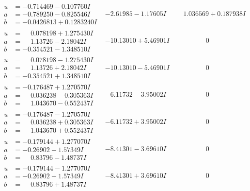 \documentclass[1p]{elsarticle_modified}
\theoremstyle{definition}
\begin{document}
$$\begin{array}{c|c|c}
\begin{aligned}
u &= -0.714469 - 0.107760 I \\
a &= -0.789250 - 0.825546 I \\
b &= -0.0426813 + 0.1283240 I\end{aligned}
 & -2.61985 - 1.17605 I & \phantom{-}1.036569 + 0.187938 I \\ \hline\begin{aligned}
u &= \phantom{-}0.078198 + 1.275430 I \\
a &= \phantom{-}1.13726 - 2.18042 I \\
b &= -0.354521 - 1.348510 I\end{aligned}
 & -10.13010 + 5.46901 I & \phantom{-0.000000 } 0 \\ \hline\begin{aligned}
u &= \phantom{-}0.078198 - 1.275430 I \\
a &= \phantom{-}1.13726 + 2.18042 I \\
b &= -0.354521 + 1.348510 I\end{aligned}
 & -10.13010 - 5.46901 I & \phantom{-0.000000 } 0 \\ \hline\begin{aligned}
u &= -0.176487 + 1.270570 I \\
a &= \phantom{-}0.036238 - 0.305363 I \\
b &= \phantom{-}1.043670 - 0.552437 I\end{aligned}
 & -6.11732 - 3.95002 I & \phantom{-0.000000 } 0 \\ \hline\begin{aligned}
u &= -0.176487 - 1.270570 I \\
a &= \phantom{-}0.036238 + 0.305363 I \\
b &= \phantom{-}1.043670 + 0.552437 I\end{aligned}
 & -6.11732 + 3.95002 I & \phantom{-0.000000 } 0 \\ \hline\begin{aligned}
u &= -0.179144 + 1.277070 I \\
a &= -0.26902 - 1.57349 I \\
b &= \phantom{-}0.83796 - 1.48737 I\end{aligned}
 & -8.41301 - 3.69610 I & \phantom{-0.000000 } 0 \\ \hline\begin{aligned}
u &= -0.179144 - 1.277070 I \\
a &= -0.26902 + 1.57349 I \\
b &= \phantom{-}0.83796 + 1.48737 I\end{aligned}
 & -8.41301 + 3.69610 I & \phantom{-0.000000 } 0 \\ \hline\begin{aligned}

\end{aligned}
\end{array}$$
\end{document}
